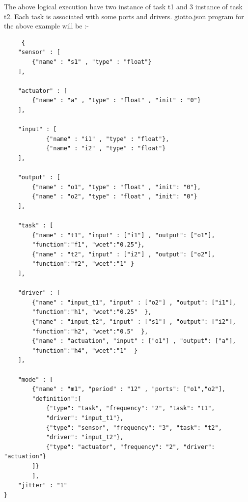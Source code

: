 \documentclass[16pt]{report}
\begin{document}
The above logical execution have two instance of task t1 and 3 instance of task t2. Each task is associated with some ports and drivers. giotto.json program for the above example will be :-
 \begin{verbatim}
     {
    "sensor" : [
        {"name" : "s1" , "type" : "float"}
    ],

    "actuator" : [
        {"name" : "a" , "type" : "float" , "init" : "0"}
    ],
    
    "input" : [
            {"name" : "i1" , "type" : "float"},
            {"name" : "i2" , "type" : "float"}
    ],

    "output" : [
        {"name" : "o1", "type" : "float" , "init": "0"},
        {"name" : "o2", "type" : "float" , "init": "0"}
    ],

    "task" : [
        {"name" : "t1", "input" : ["i1"] , "output": ["o1"], 
        "function":"f1", "wcet":"0.25"},
        {"name" : "t2", "input" : ["i2"] , "output": ["o2"], 
        "function":"f2", "wcet":"1" }
    ],

    "driver" : [
        {"name" : "input_t1", "input" : ["o2"] , "output": ["i1"], 
        "function":"h1", "wcet":"0.25"  },
        {"name" : "input_t2", "input" : ["s1"] , "output": ["i2"], 
        "function":"h2", "wcet":"0.5"  },
        {"name" : "actuation", "input" : ["o1"] , "output": ["a"],
        "function":"h4", "wcet":"1"  }            
    ],

    "mode" : [
        {"name" : "m1", "period" : "12" , "ports": ["o1","o2"], 
        "definition":[
            {"type": "task", "frequency": "2", "task": "t1", 
            "driver": "input_t1"},
            {"type": "sensor", "frequency": "3", "task": "t2", 
            "driver": "input_t2"},
            {"type": "actuator", "frequency": "2", "driver": "actuation"}
        ]}
        ],
    "jitter" : "1"
}
 \end{verbatim}
 
\end{document}
